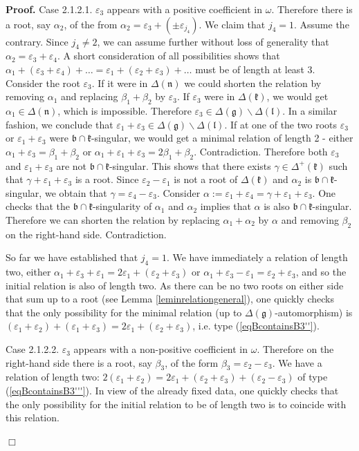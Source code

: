 \documentclass[12pt]{report}
\newenvironment{proof}[1][]{ \textbf{Proof#1. }}{$\Box$\medskip}
\newcommand{\kk}{\mathfrak{k}}
\newcommand{\nn}{\mathfrak{n}}
\newcommand{\gG}{\mathfrak{g}}
\newcommand{\bb}{\mathfrak{b}}
\newcommand{\lL}{\mathfrak{l}}
\newcommand{\refeq}[1]{(\ref{#1})}
\newcommand{\eps}{\varepsilon}
\newcommand{\pmf}[1]{ \pm}%
\begin{document}
\begin{proof}
\noindent Case 2.1.2.1. $\eps_{3}$ appears with a positive coefficient in $\omega$. Therefore there is a root, say $\alpha_2$, of the from $\alpha_2=\eps_3+(\pmf{j_4}\eps_{j_4})$. We claim that $j_4=1$. Assume the contrary. Since $j_4\neq 2$, we can assume further without loss of generality that $\alpha_2=\eps_{3}+\eps_4$. A short consideration of all possibilities shows that $\alpha_1+ (\eps_3+\eps_4)+ \dots= \eps_1 + (\eps_2 +\eps_3)+\dots$ must be of length at least 3. Consider the root $\eps_3$. If it were in $\Delta(\nn)$ we could shorten the relation by removing $\alpha_1$ and replacing $\beta_1+ \beta_2 $ by $\eps_{ 3}$. If  $\eps_3$ were in $\Delta(\kk)$, we would get $\alpha_1\in\Delta(\nn)$, which is impossible. Therefore $\eps_{3}\in\Delta(\gG)\backslash\Delta(\lL)$. In a similar fashion, we conclude that $\eps_1+\eps_3 \in \Delta (\gG) \backslash \Delta(\lL)$. If at one of the two roots $\eps_{3}$ or $\eps_1+\eps_3$ were $\bb\cap\kk$-singular, we would get a minimal relation of length 2 - either $\alpha_1+\eps_{3}=\beta_1+\beta_2$ or $\alpha_1 +\eps_1 +\eps_{3} =2\beta_1+\beta_2$. Contradiction. Therefore both $\eps_{3}$ and $\eps_1+\eps_3$ are not $\bb\cap\kk$-singular. This shows that there exists $\gamma\in\Delta^+(\kk)$ such that $\gamma+\eps_1+\eps_3$ is a root. Since $\eps_2-\eps_1$ is not a root of $\Delta(\kk)$ and $\alpha_2$ is $\bb\cap\kk$-singular, we obtain that $\gamma= \eps_4 -\eps_3$. Consider $\alpha:=\eps_1+\eps_4 = \gamma+ \eps_1 +\eps_3$. One checks that the $\bb\cap\kk$-singularity of $\alpha_1$ and $\alpha_2$ implies that $\alpha$ is also $\bb\cap\kk$-singular. Therefore we can shorten the relation by replacing $\alpha_1+\alpha_2$ by $\alpha$ and removing $\beta_2$ on the right-hand side. Contradiction.

So far we have established that $j_4=1$. We have immediately a relation of length two, either $\alpha_1+\eps_3+\eps_{1}=2\eps_1+(\eps_2+\eps_3)$ or $\alpha_1+\eps_3-\eps_1=\eps_2+\eps_3$, and so the initial relation is also of length two.  As there can be no two roots on either side that sum up to a root (see Lemma \ref{leminrelationgeneral}), one quickly checks that the only possibility for the minimal relation (up to $\Delta (\gG )$-automorphism) is $(\eps_1+\eps_2)+(\eps_1+\eps_3)=2\eps_1+(\eps_2+\eps_3)$, i.e. type \refeq{eqBcontainsB3''}.

\noindent Case 2.1.2.2. $\eps_{3}$ appears with a non-positive coefficient in $\omega$. Therefore on the right-hand side there is a root, say $\beta_3$, of the form $\beta_3=\eps_2-\eps_3$. We have a relation of length two: $2(\eps_1+\eps_2)=2\eps_1+(\eps_2+\eps_3)+(\eps_2-\eps_3)$ of type \refeq{eqBcontainsB3'''}. In view of the already fixed data, one quickly checks that the only possibility for the initial relation to be of length two is to coincide with this relation.


\end{proof}
\end{document}
